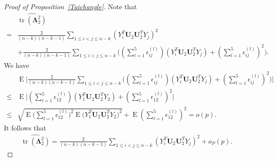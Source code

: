 \documentclass[12pt]{article} %
\DeclareMathOperator{\mytr}{tr}
\DeclareMathOperator{\myE}{E}
\newcommand{\bU}{\mathbf{U}}
\newcommand{\bfsym}[1]{\ensuremath{\boldsymbol{#1}}}
\def\bLambda {\bfsym {\Lambda}}
\theoremstyle{definition}
\begin{document}
\begin{appendices}
\begin{proof}[Proof of Proposition~\ref{Taichangle}]
        Note that
    $$
        \begin{aligned}
            &\widehat{\mytr(\bLambda_2^2)}\\
            =&
        \frac{2}{(n-k)(n-k-1)}\sum_{1\leq i<j\leq n-k}(Y_i^T \bU_2 \bU_2^T Y_j)^2 \\
            &+
            \frac{2}{(n-k)(n-k-1)}\sum_{1\leq i<j\leq n-k}\big((\sum_{l=1}^5\epsilon_{ij}^{(l)})(Y_i^T \bU_2 \bU_2^T Y_j)
            + (\sum_{l=1}^5\epsilon_{ij}^{(l)})^2\big).
        \end{aligned}
    $$
        We have
        $$
            \begin{aligned}
                &\myE\Big|\frac{2}{(n-k)(n-k-1)}\sum_{1\leq i<j\leq n-k}\big((\sum_{l=1}^5\epsilon_{ij}^{(l)})(Y_i^T \bU_2 \bU_2^T Y_j)
                +
                (\sum_{l=1}^5\epsilon_{ij}^{(l)})^2\big)\Big|\\
                \leq&
                \myE\Big|(\sum_{l=1}^5\epsilon_{12}^{(l)})(Y_1^T \bU_2 \bU_2^T Y_2)
            +
            (\sum_{l=1}^5\epsilon_{12}^{(l)})^2\Big|\\
            \leq&
            \sqrt{\myE\big(\sum_{l=1}^5\epsilon_{12}^{(l)}\big)^2\myE\big(Y_1^T \bU_2 \bU_2^T Y_2\big)^2}
            +
            \myE (\sum_{l=1}^5\epsilon_{12}^{(l)})^2=o(p).
        \end{aligned}
    $$
    It follows that
$$
    \begin{aligned}
        \widehat{\mytr(\bLambda_2^2)}
        =
    \frac{2}{(n-k)(n-k-1)}\sum_{1\leq i<j\leq n-k}(Y_i^T \bU_2 \bU_2^T Y_j)^2 
        +o_P(p).
    \end{aligned}
$$


\end{proof}
\end{appendices}
\end{document}
